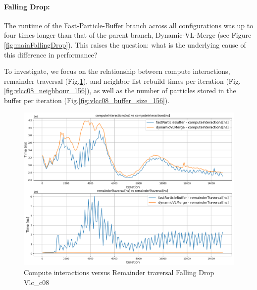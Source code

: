\paragraph{Falling Drop:}

The runtime of the Fast-Particle-Buffer branch across all configurations was up to four times longer than that of the parent branch, Dynamic-VL-Merge (see Figure \ref{fig:mainFallingDrop}). This raises the question: what is the underlying cause of this difference in performance? 

To investigate, we focus on the relationship between  compute interactions, remainder traversal (Fig.\ref{fig:vlcc08inter156}), and neighbor list rebuild times per iteration (Fig.\ref{fig:vlcc08_neighbour_156}), as well as the number of particles stored in the buffer per iteration (Fig.\ref{fig:vlcc08_buffer_size_156}).



\begin{figure}[htbp]
    \centering
        \includegraphics[width=0.9\linewidth]{graphs/fallingDrop/normalExperiments/freq/vlcc08inter156.png}
        \vspace{-0.5em}
        \caption{Compute interactions versus Remainder traversal Falling Drop Vlc\_c08}
        \label{fig:vlcc08inter156}
\end{figure}

